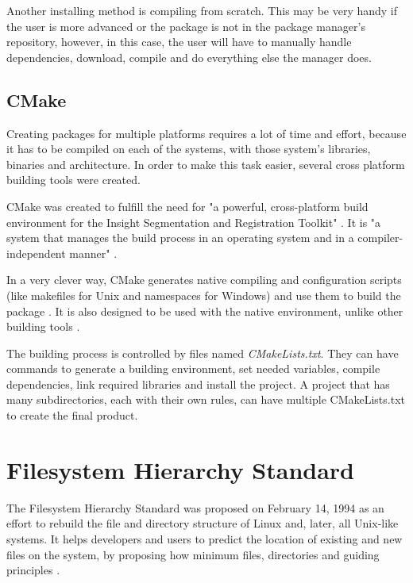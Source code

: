 Another installing method is compiling from scratch. This may be very handy if the user is more advanced or the package is not in the package manager's repository, however, in this case, the user will have to manually handle dependencies, download, compile and do everything else the manager does.

\subsection{CMake}
\label {sec:cmake}

Creating packages for multiple platforms requires a lot of time and effort, because it has to be compiled on each of the systems, with those system's libraries, binaries and architecture. In order to make this task easier, several cross platform building tools were created.

CMake was created to fulfill the need for "a powerful, cross-platform build environment for the Insight Segmentation and Registration Toolkit" \cite{cmake2017overview}. It is "a system that manages the build process in an operating system and in a compiler-independent manner" \cite{cmake2017overview}.

In a very clever way, CMake generates native compiling and configuration scripts (like makefiles for Unix and namespaces for Windows) and use them to build the package \cite{cmake2017overview}. It is also designed to be used with the native environment, unlike other building tools \cite{cmake2017overview}.

The building process is controlled by files named \textit{CMakeLists.txt}. They can have commands to generate a building environment, set needed variables, compile dependencies, link required libraries and install the project. A project that has many subdirectories, each with their own rules, can have multiple CMakeLists.txt to create the final product.


\section{Filesystem Hierarchy Standard}
\label {sec:fhs}

The Filesystem Hierarchy Standard was proposed on February 14, 1994 as an effort to rebuild the file and directory structure of Linux and, later, all Unix-like systems. It helps developers and users to predict the location of existing and new files on the system, by proposing how minimum files, directories and guiding principles \cite{allbery2015filesystem}.

